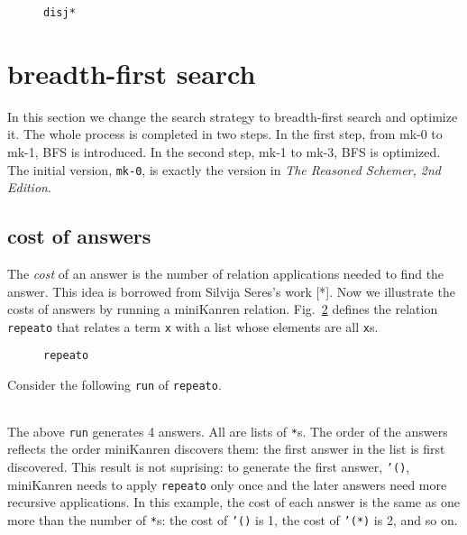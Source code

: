 \documentclass[format=acmlarge, review=true, authordraft=true]{acmart}
\begin{document}
\begin{figure}
  
  \caption{\texttt{disj*}}
  \label{disj*}
\end{figure}

\section{breadth-first search}

In this section we change the search strategy to breadth-first search and optimize it. The whole process is completed in two steps. In the first step, from mk-0 to mk-1, BFS is introduced. In the second step, mk-1 to mk-3, BFS is optimized. The initial version, \texttt{mk-0}, is exactly the version in \emph{The Reasoned Schemer, 2nd Edition}.



\subsection{cost of answers}


The \emph{cost} of an answer is the number of relation applications needed to
find the answer. This idea is borrowed from Silvija Seres's work [*].
Now we illustrate the costs of answers by running a miniKanren relation.
Fig.~\ref{def-repeato} defines the relation \texttt{repeato} that 
relates a term \texttt{x} with a list whose elements are all \texttt{x}s.

\begin{figure}
  
  \caption{\texttt{repeato}}
  \label{def-repeato}
\end{figure}

Consider the following \texttt{run} of \texttt{repeato}.
\begin{center}
  \begin{tabular}{c}
  
   \end{tabular}
\end{center}

The above \texttt{run} generates 4 answers. All are lists of \texttt{*}s.
The order of the answers reflects the order miniKanren discovers them:
the first answer in the list is first discovered. This result is not suprising:
to generate the first answer, \texttt{'()}, miniKanren needs to apply
\texttt{repeato} only once and the later answers need more recursive
applications. In this example, the cost of each answer is the same as
one more than the number of \texttt{*}s: the cost of \texttt{'()} is 1,
the cost of \texttt{'(*)} is 2, and so on.
\end{document}
